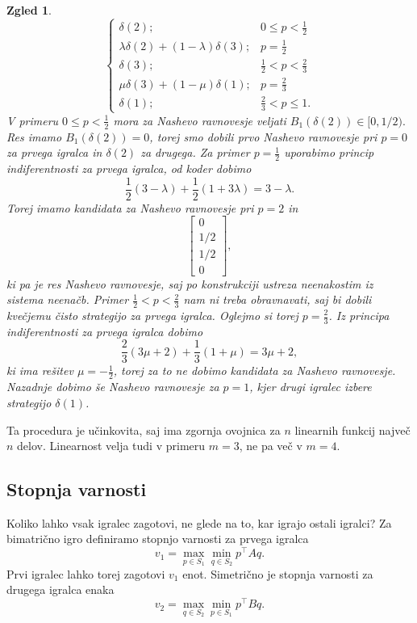 \documentclass[10pt, a4paper]{article}
\newtheorem{zgled}[izr]{Zgled}
\begin{document}
\begin{zgled}
$$\begin{cases}
    \delta(2); & 0 \leq p < \frac{1}{2}\\
    \lambda \delta(2) + (1 - \lambda) \delta(3); & p = \frac{1}{2}\\
    \delta(3); & \frac{1}{2} < p < \frac{2}{3}\\
    \mu \delta(3) + (1 - \mu) \delta(1); & p = \frac{2}{3}\\
    \delta(1); & \frac{2}{3} < p \leq 1.
  \end{cases}
  $$
  V primeru $0 \leq p < \frac{1}{2}$ mora za Nashevo ravnovesje veljati $B_1(\delta(2)) \in [0, 1 / 2).$
  Res imamo $B_1(\delta(2)) = 0$, torej smo dobili prvo Nashevo ravnovesje pri $p = 0$ za prvega igralca in 
  $\delta(2)$ za drugega.
  Za primer $p = \frac{1}{2}$ uporabimo princip indiferentnosti za prvega igralca, 
  od koder dobimo 
  $$\frac{1}{2} (3 - \lambda) + \frac{1}{2} (1 + 3\lambda) = 3 - \lambda.$$
  Torej imamo kandidata za Nashevo ravnovesje pri $p = 2$ in  
  $$\begin{bmatrix}
    0\\ 1/2 \\ 1/2\\ 0
  \end{bmatrix},$$
  ki pa je res Nashevo ravnovesje, saj po konstrukciji ustreza neenakostim iz sistema neenačb.
  Primer $\frac{1}{2} < p < \frac{2}{3}$ nam ni treba obravnavati, saj bi dobili kvečjemu čisto strategijo 
  za prvega igralca.
  Oglejmo si torej $p = \frac{2}{3}$.
  Iz principa indiferentnosti za prvega igralca dobimo 
  $$\frac{2}{3} (3\mu + 2) + \frac{1}{3} (1 + \mu) = 3 \mu + 2,$$
  ki ima rešitev $\mu = - \frac{1}{2}$, torej za to ne dobimo kandidata za Nashevo ravnovesje.
  Nazadnje dobimo še Nashevo ravnovesje za $p = 1$, kjer drugi igralec izbere strategijo $\delta(1)$.
\end{zgled}

Ta procedura je učinkovita, saj ima zgornja ovojnica za $n$ linearnih funkcij največ $n$ delov.
Linearnost velja tudi v primeru $m = 3$, ne pa več v $m = 4$.

\subsection{Stopnja varnosti}

Koliko lahko vsak igralec zagotovi, ne glede na to, kar igrajo ostali igralci?
Za bimatrično igro definiramo stopnjo varnosti za prvega igralca
$$v_1 = \max_{p \in S_1} \min_{q \in S_2} p^\top A q.$$
Prvi igralec lahko torej zagotovi $v_1$ enot. Simetrično je 
stopnja varnosti za drugega igralca enaka 
$$v_2 = \max_{q \in S_2} \min_{p \in S_1} p^\top B q.$$
\end{document}
